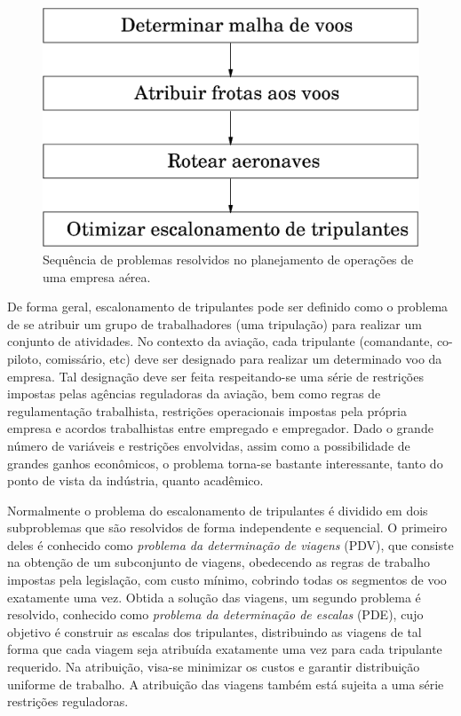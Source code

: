 \begin{figure}[htbp]
	\begin{center}
		\includegraphics[scale=0.5]{fig/planejamento.eps}
		\caption{Sequência de problemas resolvidos no planejamento de operações de uma empresa
		aérea.}
		\label{fig:planejamento}
	\end{center}
\end{figure}

De forma geral, escalonamento de tripulantes pode ser definido como o problema de se atribuir um
grupo de trabalhadores (uma tripulação) para realizar um conjunto de atividades. No contexto da
aviação, cada tripulante (comandante, co-piloto, comissário, etc) deve ser designado para realizar
um determinado voo da empresa. Tal designação deve ser feita respeitando-se uma série de restrições
impostas pelas agências reguladoras da aviação, bem como regras de regulamentação trabalhista,
restrições operacionais impostas pela própria empresa e acordos trabalhistas entre empregado e
empregador. Dado o grande número de variáveis e restrições envolvidas, assim como a possibilidade de
grandes ganhos econômicos, o problema torna-se bastante interessante, tanto do ponto de vista da
indústria, quanto acadêmico.

Normalmente o problema do escalonamento de tripulantes é dividido em dois subproblemas que são
resolvidos de forma independente e sequencial. O primeiro deles é conhecido como \emph{problema da
determinação de viagens} (PDV), que consiste na obtenção de um subconjunto de viagens, obedecendo as
regras de trabalho impostas pela legislação, com custo mínimo, cobrindo todas os segmentos de voo
exatamente uma vez. Obtida a solução das viagens, um segundo problema é resolvido, conhecido como
\emph{problema da determinação de escalas} (PDE), cujo objetivo é construir as escalas dos
tripulantes, distribuindo as viagens de tal forma que cada viagem seja atribuída exatamente uma vez
para cada tripulante requerido. Na atribuição, visa-se minimizar os custos e garantir distribuição
uniforme de trabalho. A atribuição das viagens também está sujeita a uma série restrições
reguladoras.

